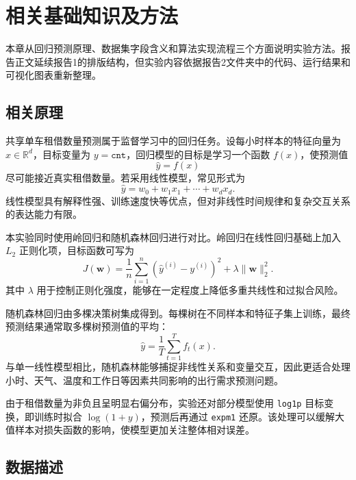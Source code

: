 \documentclass[UTF8,a4paper,12pt]{ctexart}
\begin{document}
\section{相关基础知识及方法}

本章从回归预测原理、数据集字段含义和算法实现流程三个方面说明实验方法。报告正文延续报告1的排版结构，但实验内容依据报告2文件夹中的代码、运行结果和可视化图表重新整理。

\subsection{相关原理}

共享单车租借数量预测属于监督学习中的回归任务。设每小时样本的特征向量为 $x\in \mathbb{R}^{d}$，目标变量为 $y=\texttt{cnt}$，回归模型的目标是学习一个函数 $f(x)$，使预测值
\begin{equation}
    \hat{y}=f(x)
\end{equation}
尽可能接近真实租借数量。若采用线性模型，常见形式为
\begin{equation}
    \hat{y}=w_0+w_1x_1+\cdots+w_dx_d .
\end{equation}
线性模型具有解释性强、训练速度快等优点，但对非线性时间规律和复杂交互关系的表达能力有限。

本实验同时使用岭回归和随机森林回归进行对比。岭回归在线性回归基础上加入 $L_2$ 正则化项，目标函数可写为
\begin{equation}
    J(\mathbf{w})=\frac{1}{n}\sum_{i=1}^{n}(\hat{y}^{(i)}-y^{(i)})^2+\lambda\|\mathbf{w}\|_2^2 .
\end{equation}
其中 $\lambda$ 用于控制正则化强度，能够在一定程度上降低多重共线性和过拟合风险。

随机森林回归由多棵决策树集成得到。每棵树在不同样本和特征子集上训练，最终预测结果通常取多棵树预测值的平均：
\begin{equation}
    \hat{y}=\frac{1}{T}\sum_{t=1}^{T}f_t(x).
\end{equation}
与单一线性模型相比，随机森林能够捕捉非线性关系和变量交互，因此更适合处理小时、天气、温度和工作日等因素共同影响的出行需求预测问题。

由于租借数量为非负且呈明显右偏分布，实验还对部分模型使用 \texttt{log1p} 目标变换，即训练时拟合 $\log(1+y)$，预测后再通过 \texttt{expm1} 还原。该处理可以缓解大值样本对损失函数的影响，使模型更加关注整体相对误差。

\subsection{数据描述}
\end{document}

